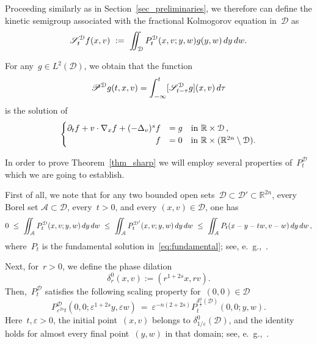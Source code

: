 \documentclass[leqno,10pt]{amsart}
\theoremstyle{plain}
\theoremstyle{remark}
\numberwithin{equation}{section}
\def \d{\,{\rm d}}
\def\er{\mathbb{R}}
\newcommand{\Ac}{\mathcal{A}}
\newcommand{\eps}{\varepsilon}
\begin{document}
{Proceeding similarly as in Section~\ref{sec_preliminaries}, we therefore can define  the kinetic semigroup associated with the fractional Kolmogorov equation in~$\mathcal{D}$ as
\begin{equation}\label{def:kin-semigroup-D}
\mathscr{S}_t^{\mathcal{D}}f(x,v)
 \ := \ \iint_{\mathcal{D}}P_t^{\mathcal{D}}(x,v;y,w)g(y,w)\d y\d w.
\end{equation}

For any~$g \in L^2(\mathcal{D})$, we obtain that the function
\[
\mathscr{P}^{\mathcal{D}}g(t,x,v) = \int_{-\infty}^t [\mathscr{S}_{t-\tau}^\mathcal{D}g](x,v)\d\tau
\]
is the solution of
\[
	\begin{cases}
		\partial_t f+ v\cdot \nabla_x f + (-\Delta_v)^s f &= g \quad \text{in}~\er \times \mathcal{D}\,, \\
		\hfill f&=0 \quad \text{in}~\er \times (\mathbb{R}^{2n} \setminus \mathcal{D}).
	\end{cases}
\]


\vspace{2mm}
In order to prove Theorem~\ref{thm_sharp} we will employ several properties of~$P^\mathcal{D}_t$ which we are going to establish.

 First of all, we note that for any two bounded open sets~$\mathcal{D}\subset\mathcal{D}' \subset \mathbb{R}^{2n}$, every Borel set
$\mathcal{A}\subset\mathcal{D}$, every~$t>0$, and every
$(x,v)\in\mathcal{D}$, one has
\begin{equation}\label{eq:maximum-principle}
0 \ \leq\ \iint_{\Ac}P_t^{\mathcal{D}}(x,v;y,w)\d y\d w \ \leq\ \iint_{\Ac}P_t^{\mathcal{D}'}(x,v;y,w)\d y\d w 
\ \leq\ \iint_{\Ac}P_t(x-y-tw,v-w)\d y\d w\,,
\end{equation}
where~$P_t$ is the fundamental solution in~\eqref{eq:fundamental}; see, e.~\!g.,~\cite[Formula~(2.4)]{KW24c}.

Next, for~$r>0$, we define the phase dilation
\[
\delta_r^0(x,v):=(r^{1+2s}x,rv).
\]
Then,~$P^{\mathcal{D}}_t$ satisfies the following scaling property for~$(0,0) \in \mathcal{D}$
\begin{equation}\label{eq:fundamental-dilation}
P_{\eps^{2s}t}^{\mathcal{D}}
 (0,0;\eps^{1+2s}y,\eps w) \ = \ \eps^{-n(2+2s)}
P_t^{\delta_\frac{1}{\eps}^0(\mathcal{D})}(0,0;y,w).
\end{equation}
Here~$t,\eps>0$, the initial point~$(x,v)$ belongs to
$\delta_{1/\eps}^0(\mathcal{D})$, and the identity holds for almost every
final point~$(y,w)$ in that domain; see, e.~\!g.,~\cite[Formula~(2.5)]{KW24c}.



}
\end{document}
